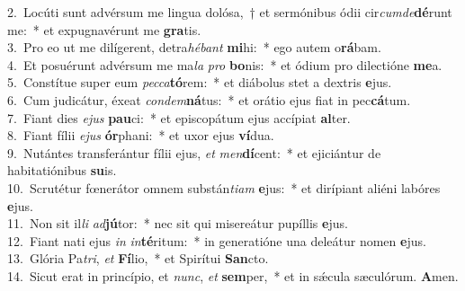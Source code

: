 {2.~}Locúti sunt advérsum me lingua dolósa,~† et sermónibus ódii cir\textit{cum}\textit{de}\textbf{dé}runt me:~* et expugnavérunt me \textbf{gra}tis.\\
{3.~}Pro eo ut me dilígerent, detra\textit{hé}\textit{bant} \textbf{mi}hi:~* ego autem o\textbf{rá}bam.\\
{4.~}Et posuérunt advérsum me ma\textit{la} \textit{pro} \textbf{bo}nis:~* et ódium pro dilectióne \textbf{me}a.\\
{5.~}Constítue super eum \textit{pec}\textit{ca}\textbf{tó}rem:~* et diábolus stet a dextris \textbf{e}jus.\\
{6.~}Cum judicátur, éxeat \textit{con}\textit{dem}\textbf{ná}tus:~* et orátio ejus fiat in pec\textbf{cá}tum.\\
{7.~}Fiant dies \textit{e}\textit{jus} \textbf{pau}ci:~* et episcopátum ejus accípiat \textbf{al}ter.\\
{8.~}Fiant fílii \textit{e}\textit{jus} \textbf{ór}phani:~* et uxor ejus \textbf{ví}dua.\\
{9.~}Nutántes transferántur fílii ejus, \textit{et} \textit{men}\textbf{dí}cent:~* et ejiciántur de habitatiónibus \textbf{su}is.\\
{10.~}Scrutétur fœnerátor omnem substán\textit{ti}\textit{am} \textbf{e}jus:~* et dirípiant aliéni labóres \textbf{e}jus.\\
{11.~}Non sit il\textit{li} \textit{ad}\textbf{jú}tor:~* nec sit qui misereátur pupíllis \textbf{e}jus.\\
{12.~}Fiant nati ejus \textit{in} \textit{in}\textbf{té}ritum:~* in generatióne una deleátur nomen \textbf{e}jus.\\
{13.~}Glória Pa\textit{tri}, \textit{et} \textbf{Fí}lio,~* et Spirítui \textbf{San}cto.\\
{14.~}Sicut erat in princípio, et \textit{nunc}, \textit{et} \textbf{sem}per,~* et in sǽcula sæculórum. \textbf{A}men.\\
